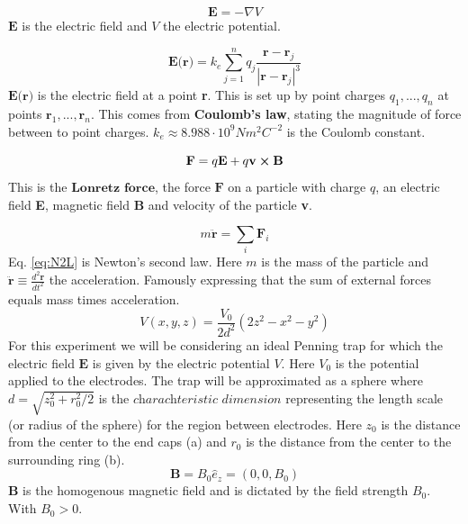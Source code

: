 \documentclass[english,notitlepage,reprint,nofootinbib]{revtex4-1}  %
\begin{document}
\begin{equation}\label{eq:el_field}
    \textbf{E} = - \nabla V
\end{equation}
$\textbf{E}$ is the electric field and $V$ the electric potential.

\begin{equation}\label{eq:el_at_r}
    \textbf{E(r)} = k_e \sum_{j=1}^{n} q_j \frac{\textbf{r} - \textbf{r}_j}{|\textbf{r} - \textbf{r}_j|^3}
\end{equation}
$\textbf{E(r)}$ is the electric field at a point \textbf{r}. This is set up by point charges ${q_1,...,q_n}$ at points ${\textbf{r}_1,...,\textbf{r}_n}$. This comes from \textbf{Coulomb's law}, stating the magnitude of force between to point charges. $k_e \approx 8.988 \cdot 10^9 N m^2 C^{-2}$ is the Coulomb constant.

\begin{equation}\label{eq:lorentz}
    \textbf{F} = q\textbf{E} + q \textbf{v} \cross \textbf{B}
\end{equation}
This is the $\textbf{Lonretz force}$, the force $\textbf{F}$ on a particle
with charge $q$, an electric field \textbf{E}, magnetic field \textbf{B} and velocity of the particle \textbf{v}.

\begin{equation}\label{eq:N2L}
    m \ddot{\textbf{r}} = \sum_i \textbf{F}_i
\end{equation}
Eq. \ref{eq:N2L} is Newton's second law. Here $m$ is the mass of the particle and $\ddot{\textbf{r}} \equiv \frac{d^2 \textbf{r}}{dt^2}$ the acceleration.
Famously expressing that the sum of external forces equals mass times acceleration.
\begin{equation}\label{eq:el_potential}
    V(x,y,z) = \frac{V_0}{2d^2} (2z^2 - x^2 - y^2)
\end{equation}
For this experiment we will be considering an ideal Penning trap for which the electric field $\textbf{E}$ is given by the electric potential $V$.
Here $V_0$ is the potential applied to the electrodes. The trap will be approximated as a sphere where $d = \sqrt{z_0^2 + r_0^2 / 2}$ is the
$\textit{charachteristic dimension}$ representing the length scale (or radius of the sphere)
for the region between electrodes. Here $z_0$ is the distance from the center to the end caps (a) and $r_0$ is the distance from the center
to the surrounding ring (b).
\begin{equation}\label{eq:mag_field}
    \textbf{B} = B_0 \hat{e}_z = (0,0,B_0)
\end{equation}
$\textbf{B}$ is the homogenous magnetic field and is dictated by the field strength $B_0$. With $B_0 > 0$.
\end{document}
